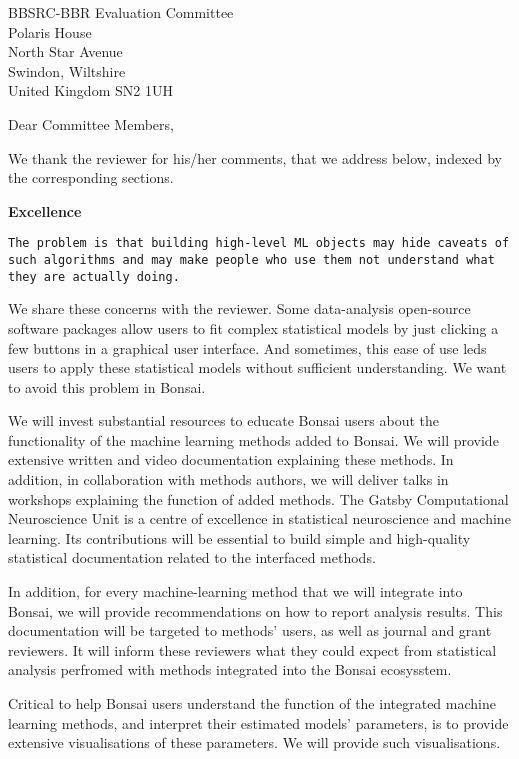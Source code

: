 \documentclass[12pt]{letter}
\begin{document}
\begin{letter}{
    BBSRC-BBR Evaluation Committee\\
    Polaris House\\
    North Star Avenue\\
    Swindon, Wiltshire\\
    United Kingdom SN2 1UH
}
\opening{Dear Committee Members,}

We thank the reviewer for his/her comments, that we address below, indexed by
the corresponding sections.

\noindent\textbf{Excellence}

\texttt{The problem is that building high-level ML objects may hide caveats of
such algorithms and may make people who use them not understand what they are
actually doing.}

We share these concerns with the reviewer. Some data-analysis open-source
software packages allow users to fit complex statistical models by just
clicking a few buttons in a graphical user interface. And sometimes, this ease
of use leds users to apply these statistical models without sufficient
understanding. We want to avoid this problem in Bonsai.

We will invest substantial resources to educate Bonsai users about the
functionality of the machine learning methods added to Bonsai.  We will provide
extensive written and video documentation explaining these methods.  In
addition, in collaboration with methods authors, we will deliver talks in
workshops explaining the function of added methods.
%
The Gatsby Computational Neuroscience Unit is a centre of excellence in
statistical neuroscience and machine learning. Its contributions will be
essential to build simple and high-quality statistical documentation related to
the interfaced methods.

In addition, for every machine-learning method that we will integrate into
Bonsai, we will provide recommendations on how to report analysis results.
This documentation will be targeted to methods' users, as well as journal and
grant reviewers. It will inform these reviewers what they could expect from
statistical analysis perfromed with methods integrated into the Bonsai
ecosysstem.

Critical to help Bonsai users understand the function of the integrated machine
learning methods, and interpret their estimated models' parameters, is to
provide extensive visualisations of these parameters. We will provide such
visualisations.


\end{letter}
\end{document}
